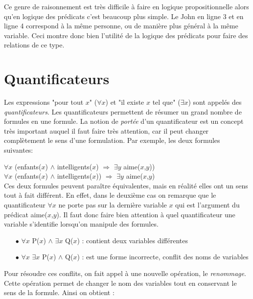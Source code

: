 Ce genre de raisonnement est très difficile à faire en logique propositionnelle alors qu'en logique des prédicats c'est beaucoup plus simple.
Le John en ligne 3 et en ligne 4 correspond à la même personne, ou de manière plus général à la même variable.
Ceci montre donc bien l'utilité de la logique des prédicats pour faire des relations de ce type.

\section{Quantificateurs}

Les expressions "pour tout $x$" ($\forall x$) et "il existe $x$ tel que" ($\exists x$) sont appelés des {\em quantificateurs}.
Les quantificateurs permettent de résumer un grand nombre de formules en une formule.
La notion de {\em portée} d'un quantificateur est un concept très important auquel il faut faire très attention,
car il peut changer complètement le sens d'une formulation.
Par exemple, les deux formules suivantes:

$\forall x$ (enfants($x$) $\wedge$ intelligents($x$) $\Rightarrow$ $\exists y$ aime($x$,$y$)) \\

$\forall x$ (enfants($x$) $\wedge$ intelligents($x$)) $\Rightarrow$ $\exists y$ aime($x$,$y$) \\

Ces deux formules peuvent paraître équivalentes, mais en réalité elles ont un sens tout à fait différent.
En effet, dans le deuxième cas on remarque que le quantificateur $\forall x$ ne porte pas sur
la dernière variable $x$ qui est l'argument du prédicat aime($x$,$y$).
Il faut donc faire bien attention à quel quantificateur une variable s'identifie lorsqu'on manipule des formules.

\begin{itemize}
\item[$\bullet$] $\forall x$ P($x$) $\wedge$ $\exists x$ Q($x$) : contient deux variables différentes\\
 
\item[$\bullet$] $\forall x$ $\exists x$  P($x$) $\wedge$ Q($x$) : est une forme incorrecte, conflit des noms de variables \\
\end{itemize}

Pour résoudre ces conflits, on fait appel à une nouvelle opération, le {\em renommage}.
Cette opération permet de changer le nom des variables tout en conservant le sens de la formule. Ainsi on obtient : \\


